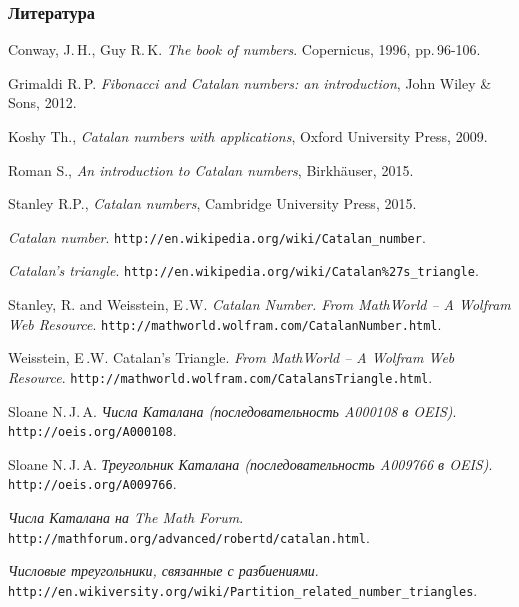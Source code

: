 \documentclass[mathserif]{beamer}
\begin{document}
\begin{frame}[fragile]%
\frametitle{Литература}
\tiny
\begin{thebibliography}{99}
Conway, J.\,H., Guy R.\,K. {\itshape The book of numbers}. Copernicus, 1996, pp.\,96-106.

Grimaldi R.\,P. {\itshape Fibonacci and Catalan numbers: an introduction}, John Wiley \& Sons, 2012.

Koshy Th., {\itshape Catalan numbers with applications}, Oxford University Press, 2009.

Roman S., {\itshape An introduction to Catalan numbers}, Birkh\"{a}user, 2015.

Stanley R.P., {\itshape Catalan numbers}, Cambridge University Press, 2015.

{\itshape Catalan number}.
\texttt{http://en.wikipedia.org/wiki/Catalan\_number}.

{\itshape Catalan's triangle}.
\texttt{http://en.wikipedia.org/wiki/Catalan\%27s\_triangle}.

Stanley, R. and Weisstein, E\,.W. {\itshape Catalan Number. From MathWorld – A Wolfram Web Resource}.
\texttt{http://mathworld.wolfram.com/CatalanNumber.html}.

Weisstein, E\,.W. Catalan's Triangle. {\itshape From MathWorld – A Wolfram Web Resource}.
\texttt{http://mathworld.wolfram.com/CatalansTriangle.html}.

Sloane N.\,J.\,A. {\itshape Числа Каталана (последовательность A000108 в OEIS)}.
\texttt{http://oeis.org/A000108}.

Sloane N.\,J.\,A. {\itshape Треугольник Каталана (последовательность A009766 в OEIS)}.
\texttt{http://oeis.org/A009766}.

{\itshape Числа Каталана на The Math Forum}.
\texttt{http://mathforum.org/advanced/robertd/catalan.html}.

{\itshape Числовые треугольники, связанные с разбиениями}.
\texttt{http://en.wikiversity.org/wiki/Partition\_related\_number\_triangles}.
\end{thebibliography}
\end{frame}
\end{document}
